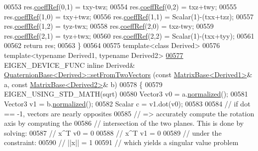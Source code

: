 \begin{DoxyCode}
{00553   res.\hyperlink{class_eigen_1_1_plain_object_base_a25626a55b26a4323565f79d1b7c48ea8}{coeffRef}(0,1) = txy-twz;
00554   res.\hyperlink{class_eigen_1_1_plain_object_base_a25626a55b26a4323565f79d1b7c48ea8}{coeffRef}(0,2) = txz+twy;
00555   res.\hyperlink{class_eigen_1_1_plain_object_base_a25626a55b26a4323565f79d1b7c48ea8}{coeffRef}(1,0) = txy+twz;
00556   res.\hyperlink{class_eigen_1_1_plain_object_base_a25626a55b26a4323565f79d1b7c48ea8}{coeffRef}(1,1) = Scalar(1)-(txx+tzz);
00557   res.\hyperlink{class_eigen_1_1_plain_object_base_a25626a55b26a4323565f79d1b7c48ea8}{coeffRef}(1,2) = tyz-twx;
00558   res.\hyperlink{class_eigen_1_1_plain_object_base_a25626a55b26a4323565f79d1b7c48ea8}{coeffRef}(2,0) = txz-twy;
00559   res.\hyperlink{class_eigen_1_1_plain_object_base_a25626a55b26a4323565f79d1b7c48ea8}{coeffRef}(2,1) = tyz+twx;
00560   res.\hyperlink{class_eigen_1_1_plain_object_base_a25626a55b26a4323565f79d1b7c48ea8}{coeffRef}(2,2) = Scalar(1)-(txx+tyy);
00561 
00562   \textcolor{keywordflow}{return} res;
00563 \}
00564 
00575 \textcolor{keyword}{template}<\textcolor{keyword}{class} Derived>
00576 \textcolor{keyword}{template}<\textcolor{keyword}{typename} Derived1, \textcolor{keyword}{typename} Derived2>
\hyperlink{group___geometry___module_a61ce1b4b1faf6849c9663fd86e9b3a70}{00577} EIGEN\_DEVICE\_FUNC \textcolor{keyword}{inline} Derived& \hyperlink{group___geometry___module_a61ce1b4b1faf6849c9663fd86e9b3a70}{QuaternionBase<Derived>::setFromTwoVectors}
      (\textcolor{keyword}{const} \hyperlink{group___core___module_class_eigen_1_1_matrix_base}{MatrixBase<Derived1>}& a, \textcolor{keyword}{const} \hyperlink{group___core___module_class_eigen_1_1_matrix_base}{MatrixBase<Derived2>}& b)
00578 \{
00579   EIGEN\_USING\_STD\_MATH(sqrt)
00580   Vector3 v0 = a.\hyperlink{group___core___module_a5cf2fd4c57e59604fd4116158fd34308}{normalized}();
00581   Vector3 v1 = b.\hyperlink{group___core___module_a5cf2fd4c57e59604fd4116158fd34308}{normalized}();
00582   Scalar c = v1.dot(v0);
00583 
00584   \textcolor{comment}{// if dot == -1, vectors are nearly opposites}
00585   \textcolor{comment}{// => accurately compute the rotation axis by computing the}
00586   \textcolor{comment}{//    intersection of the two planes. This is done by solving:}
00587   \textcolor{comment}{//       x^T v0 = 0}
00588   \textcolor{comment}{//       x^T v1 = 0}
00589   \textcolor{comment}{//    under the constraint:}
00590   \textcolor{comment}{//       ||x|| = 1}
00591   \textcolor{comment}{//    which yields a singular value problem}
}
\end{DoxyCode}
